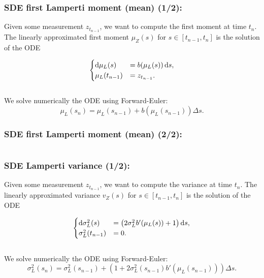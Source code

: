 \documentclass[aspectratio=169]{beamer}\usepackage[utf8]{inputenc}
\begin{document}
\begin{frame}\frametitle{SDE first Lamperti moment (mean) (1/2):}
Given some measurement $z_{t_{n-1}}$, we want to compute the first moment at time $t_n$. The linearly approximated first moment $\mu_Z(s)$ for $s\in[t_{n-1},t_n]$ is the solution of the ODE

\begin{equation*}
\begin{cases}
\dif \mu_L(s)&=b(\mu_L(s))\dif s,\\
\mu_L(t_{n-1})&=z_{t_{n-1}}.
\end{cases}
\end{equation*}
\quad\\
We solve numerically the ODE using Forward-Euler:
\begin{equation*}
\mu_L(s_{n})=\mu_L(s_{n-1})+b(\mu_L(s_{n-1}))\Delta s.
\end{equation*}

\end{frame}


\begin{frame}\frametitle{SDE first Lamperti moment (mean) (2/2):}

\begin{center}
\begin{tabular}{|c|}
\toprule
{\scriptsize

}\\
\bottomrule
\end{tabular}
\end{center}

\end{frame}


\begin{frame}\frametitle{SDE Lamperti variance (1/2):}
Given some measurement $z_{t_{n-1}}$, we want to compute the variance at time $t_n$. The linearly approximated variance $v_Z(s)$ for $s\in[t_{n-1},t_n]$ is the solution of the ODE

\begin{equation*}
\begin{cases}
\dif \sigma^2_L(s)&=\left(2\sigma^2_Lb'(\mu_L(s))+1\right)\dif s,\\
\sigma^2_L(t_{n-1})&=0.
\end{cases}
\end{equation*}
\quad\\
We solve numerically the ODE using Forward-Euler:
\begin{equation*}
\sigma^2_L(s_{n})=\sigma^2_L(s_{n-1})+\left(1+2\sigma^2_L(s_{n-1})b'(\mu_L(s_{n-1}))\right)\Delta s.
\end{equation*}

\end{frame}
\end{document}
